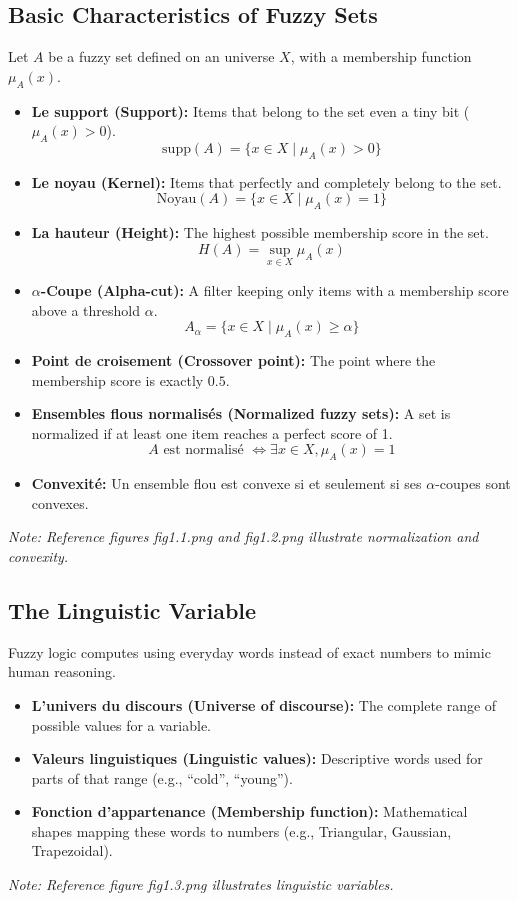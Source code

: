\documentclass[11pt,a4paper]{article}
\begin{document}
\subsection{Basic Characteristics of Fuzzy Sets}
Let $A$ be a fuzzy set defined on an universe $X$, with a membership function $\mu_A(x)$.
\begin{itemize}
    \item \textbf{Le support (Support):} Items that belong to the set even a tiny bit ($\mu_A(x) > 0$).
    \[ \text{supp}(A) = \{x \in X \mid \mu_A(x) > 0\} \]
    
    \item \textbf{Le noyau (Kernel):} Items that perfectly and completely belong to the set.
    \[ \text{Noyau}(A) = \{x \in X \mid \mu_A(x) = 1\} \]
    
    \item \textbf{La hauteur (Height):} The highest possible membership score in the set.
    \[ H(A) = \sup_{x \in X} \mu_A(x) \]
    
    \item \textbf{$\alpha$-Coupe (Alpha-cut):} A filter keeping only items with a membership score above a threshold $\alpha$.
    \[ A_\alpha = \{x \in X \mid \mu_A(x) \geq \alpha\} \]
    
    \item \textbf{Point de croisement (Crossover point):} The point where the membership score is exactly $0.5$.
    
    \item \textbf{Ensembles flous normalisés (Normalized fuzzy sets):} A set is normalized if at least one item reaches a perfect score of 1.
    \[ A \text{ est normalisé } \iff \exists x \in X, \mu_A(x) = 1 \]
    
    \item \textbf{Convexité:} Un ensemble flou est convexe si et seulement si ses $\alpha$-coupes sont convexes.
\end{itemize}
\vspace{0.5cm}
\textit{Note: Reference figures fig1.1.png and fig1.2.png illustrate normalization and convexity.}

\subsection{The Linguistic Variable}
Fuzzy logic computes using everyday words instead of exact numbers to mimic human reasoning.
\begin{itemize}
    \item \textbf{L'univers du discours (Universe of discourse):} The complete range of possible values for a variable.
    \item \textbf{Valeurs linguistiques (Linguistic values):} Descriptive words used for parts of that range (e.g., ``cold'', ``young'').
    \item \textbf{Fonction d'appartenance (Membership function):} Mathematical shapes mapping these words to numbers (e.g., Triangular, Gaussian, Trapezoidal).
\end{itemize}
\textit{Note: Reference figure fig1.3.png illustrates linguistic variables.}
\end{document}
